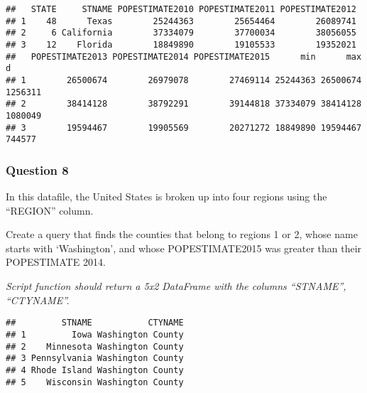 \documentclass[
]{article}
\newenvironment{Shaded}{\begin{snugshade}}{\end{snugshade}}
\newcommand{\DecValTok}[1]{\textcolor[rgb]{0.00,0.00,0.81}{#1}}
\newcommand{\KeywordTok}[1]{\textcolor[rgb]{0.13,0.29,0.53}{\textbf{#1}}}
\newcommand{\NormalTok}[1]{#1}
\newcommand{\OperatorTok}[1]{\textcolor[rgb]{0.81,0.36,0.00}{\textbf{#1}}}
\newcommand{\StringTok}[1]{\textcolor[rgb]{0.31,0.60,0.02}{#1}}
\begin{document}
\begin{verbatim}
##   STATE     STNAME POPESTIMATE2010 POPESTIMATE2011 POPESTIMATE2012
## 1    48      Texas        25244363        25654464        26089741
## 2     6 California        37334079        37700034        38056055
## 3    12    Florida        18849890        19105533        19352021
##   POPESTIMATE2013 POPESTIMATE2014 POPESTIMATE2015      min      max       d
## 1        26500674        26979078        27469114 25244363 26500674 1256311
## 2        38414128        38792291        39144818 37334079 38414128 1080049
## 3        19594467        19905569        20271272 18849890 19594467  744577
\end{verbatim}

\hypertarget{question-8}{%
\subsubsection{Question 8}\label{question-8}}

In this datafile, the United States is broken up into four regions using
the ``REGION'' column.

Create a query that finds the counties that belong to regions 1 or 2,
whose name starts with `Washington', and whose POPESTIMATE2015 was
greater than their POPESTIMATE 2014.

\emph{Script function should return a 5x2 DataFrame with the columns
``STNAME'', ``CTYNAME''.}

\begin{Shaded}
\end{Shaded}

\begin{verbatim}
##         STNAME           CTYNAME
## 1         Iowa Washington County
## 2    Minnesota Washington County
## 3 Pennsylvania Washington County
## 4 Rhode Island Washington County
## 5    Wisconsin Washington County
\end{verbatim}
\end{document}
